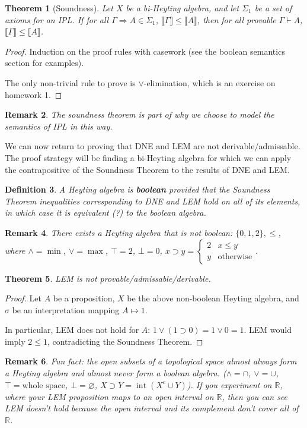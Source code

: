 \documentclass[12pt]{article}
\newtheorem{theorem}{Theorem}[section]
\newtheorem{definition}[theorem]{Definition}
\newtheorem{remark}[theorem]{Remark}
\newcommand{\db}[1]{\llbracket #1 \rrbracket}
\begin{document}
\begin{theorem}[Soundness]
Let $X$ be a bi-Heyting algebra, and let $\Sigma_1$ be a set of axioms for an IPL. If for all $\Gamma \Rightarrow A \in \Sigma_1$, $\db{\Gamma} \leq \db{A}$, then for all provable $\Gamma \vdash A$, $\db{\Gamma} \leq \db{A}$. 
\end{theorem}
\begin{proof}
Induction on the proof rules with casework (see the boolean semantics section for examples).

The only non-trivial rule to prove is $\lor$-elimination, which is an exercise on homework 1.
\end{proof}

\begin{remark}
The soundness theorem is part of why we choose to model the semantics of IPL in this way.
\end{remark}

We can now return to proving that DNE and LEM are not derivable/admissable. The proof strategy will be finding a bi-Heyting algebra for which we can apply the contrapositive of the Soundness Theorem to the results of DNE and LEM.

\begin{definition}
A Heyting algebra is \textbf{boolean} provided that the Soundness Theorem inequalities corresponding to DNE and LEM hold on all of its elements, in which case it is equivalent (?) to the boolean algebra. 
\end{definition}

\begin{remark}
There exists a Heyting algebra that is not boolean:
$\{0, 1, 2\}, \leq$, where $\land = \min$, $\lor = \max$, $\top = 2$, $\bot = 0$, $x \supset y = \begin{cases}2 & x \leq y \\ y & \text{otherwise}\end{cases}$.
\end{remark}

\begin{theorem}
LEM is not provable/admissable/derivable.
\end{theorem}

\begin{proof}
Let $A$ be a proposition, $X$ be the above non-boolean Heyting algebra, and $\sigma$ be an interpretation mapping $A \mapsto 1$.

In particular, LEM does not hold for $A$: $1 \lor (1 \supset 0) = 1 \lor 0 = 1$. LEM would imply $2 \leq 1$, contradicting the Soundness Theorem.
\end{proof}

\begin{remark}
Fun fact: the open subsets of a topological space almost always form a Heyting algebra and almost never form a boolean algebra.
($\land = \cap$, $\lor = \cup$, $\top = \text{whole space}$, $\bot = \varnothing$, $X \supset Y = \operatorname{int}(X^c \cup Y)$). If you experiment on $\mathbb{R}$, where your LEM proposition maps to an open interval on $\mathbb{R}$, then you can see LEM doesn't hold because the open interval and its complement don't cover all of $\mathbb{R}$. 
\end{remark}
\end{document}
